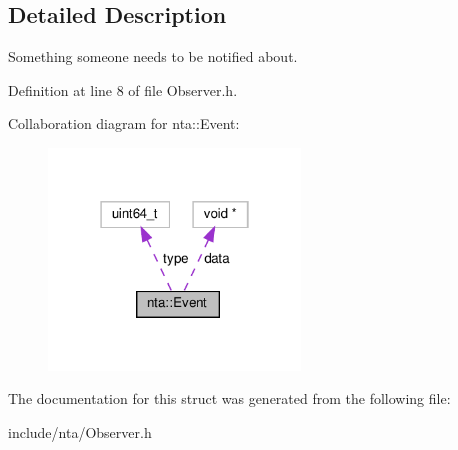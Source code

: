 \subsection{Detailed Description}
Something someone needs to be notified about. 

Definition at line 8 of file Observer.\+h.



Collaboration diagram for nta\+:\+:Event\+:
\nopagebreak
\begin{figure}[H]
\begin{center}
\leavevmode
\includegraphics[width=190pt]{dd/d38/structnta_1_1Event__coll__graph}
\end{center}
\end{figure}


The documentation for this struct was generated from the following file\+:\begin{DoxyCompactItemize}
\item 
include/nta/Observer.\+h\end{DoxyCompactItemize}
